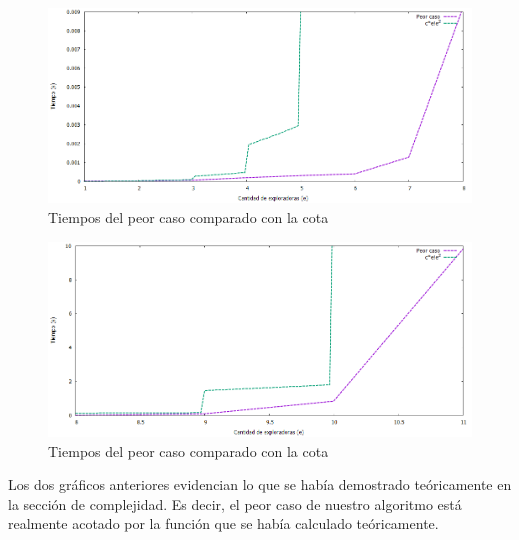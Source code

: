 \documentclass[10pt, a4paper]{article}
\begin{document}
	\begin{figure}[H]
  		\centering
   	 	\includegraphics[width=1\textwidth]
   	 	{Imagenes/exploradorasCotaPropiaChico.png}
		\caption{Tiempos del peor caso comparado con la cota}
	\end{figure}	
	\begin{figure}[H]
  		\centering
   	 	\includegraphics[width=1\textwidth]
   	 	{Imagenes/exploradorasCotaPropia.png}
		\caption{Tiempos del peor caso comparado con la cota}
	\end{figure}
	
	Los dos gráficos anteriores evidencian lo que se había demostrado teóricamente en la sección de complejidad. Es decir, el peor caso de nuestro algoritmo está realmente acotado por la función que se había calculado teóricamente.
\end{document}

